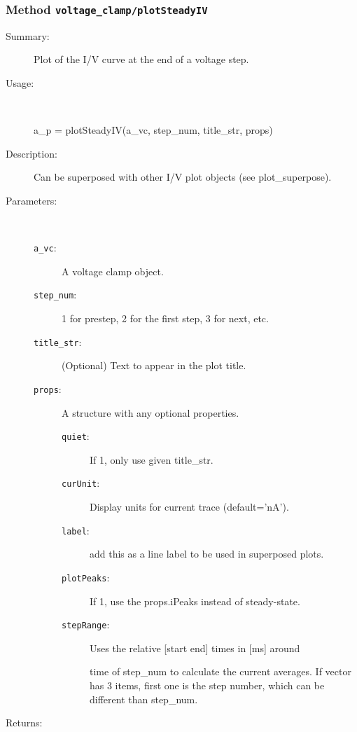 \subsubsection[Method \texttt{plotSteadyIV}]{Method \texttt{voltage\_clamp/plotSteadyIV}}%
%
\label{ref_voltage_clamp__plotSteadyIV}%
\hypertarget{ref_voltage_clamp__plotSteadyIV}{}%
\begin{description}
\item[Summary:]Plot of the I/V curve at the end of a voltage step.
%
\item[Usage:]~%
\begin{lyxcode}%
a\_p = plotSteadyIV(a\_vc, step\_num, title\_str, props)
%
\end{lyxcode}%
%
\item[Description:]%
Can be superposed with other I/V plot objects (see plot\_superpose).
\item[Parameters:]~
\begin{description}%
\item[\texttt{a\_vc}:]
 A voltage clamp object.
\item[\texttt{step\_num}:]
 1 for prestep, 2 for the first step, 3 for next, etc.
\item[\texttt{title\_str}:]
 (Optional) Text to appear in the plot title.
\item[\texttt{props}:]
 A structure with any optional properties.
\begin{description}%
\item[\texttt{quiet}:]
 If 1, only use given title\_str.
\item[\texttt{curUnit}:]
 Display units for current trace (default='nA').
\item[\texttt{label}:]
 add this as a line label to be used in superposed plots.
\item[\texttt{plotPeaks}:]
 If 1, use the props.iPeaks instead of steady-state.
\item[\texttt{stepRange}:]
 Uses the relative [start end] times in [ms] around 

time of step\_num to calculate the current averages. If vector has
3 items, first one is the step number, which can be different
than step\_num.
\end{description}%
\end{description}%
%
\item[Returns:
]~


\end{description}
